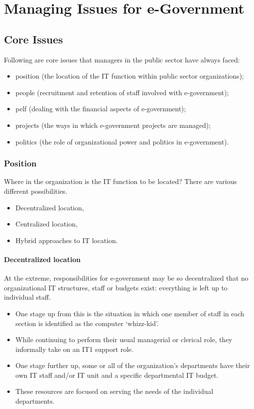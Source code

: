  
 \section{Managing Issues for e-Government}
 
\subsection{Core Issues}
Following are core issues that managers in the public sector have always faced:
\begin{itemize}
	\item position (the location of the IT function	within public sector organizations);
	\item people (recruitment and retention of staff involved with e-government);
	\item pelf (dealing with the financial aspects of e-government);
	\item projects (the ways in which e-government projects are managed);
	\item politics (the role of organizational power and politics in e-government).
\end{itemize}

\subsubsection{Position}
Where in the organization is the IT function to be located? There are various different possibilities.
\begin{itemize}
	\item Decentralized location,
	\item Centralized location,
	\item Hybrid approaches to IT location.
\end{itemize}

\paragraph*{Decentralized location}
At the extreme, responsibilities for e-government may be so decentralized that no organizational IT structures, staff or budgets exist: everything is left up to individual staff. 
\begin{itemize}
	\item One stage up from this is the situation in which one member of staff in each section is identified as the computer ‘whizz-kid’. 
	\item While continuing to perform their usual managerial or clerical role, they	informally take on an IT1 support role. 
	\item One stage further up, some or all of the organization’s departments have their own IT staff and/or IT unit and a specific departmental IT budget. 
	\item These resources are focused on serving the needs of the individual departments.
\end{itemize}


